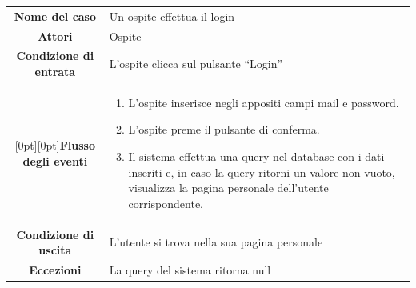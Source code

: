 \documentclass[a4paper,12pt]{article}
\begin{document}
\clearpage
\begin{tabularx}{\textwidth}{|c|X|} 
\rowcolor[gray]{.9}\hline \textbf{Nome del caso} & Un ospite effettua il login \\
\rowcolor[gray]{.9}\hline \textbf{Attori} & Ospite \\ 
\rowcolor[gray]{.9}\hline \textbf{Condizione di entrata} & L'ospite clicca sul pulsante “Login” \\
\rowcolor[gray]{.9}\hline \raisebox{-10ex}[0pt][0pt]{\textbf{Flusso degli eventi}} & 
\begin{enumerate}
\itemsep0em 
\item L'ospite inserisce negli appositi campi mail e password.
\item L'ospite preme il pulsante di conferma.
\item Il sistema effettua una query nel database con i dati inseriti e, in caso la query ritorni un valore non vuoto, visualizza la pagina personale dell'utente corrispondente.
\end{enumerate}
 \\ 
\rowcolor[gray]{.9}\hline \textbf{Condizione di uscita} & L'utente si trova nella sua pagina personale \\
\rowcolor[gray]{.9}\hline \textbf{Eccezioni} & La query del sistema ritorna null
\\
\hline 
\end{tabularx} \\[3\baselineskip]
\end{document}
